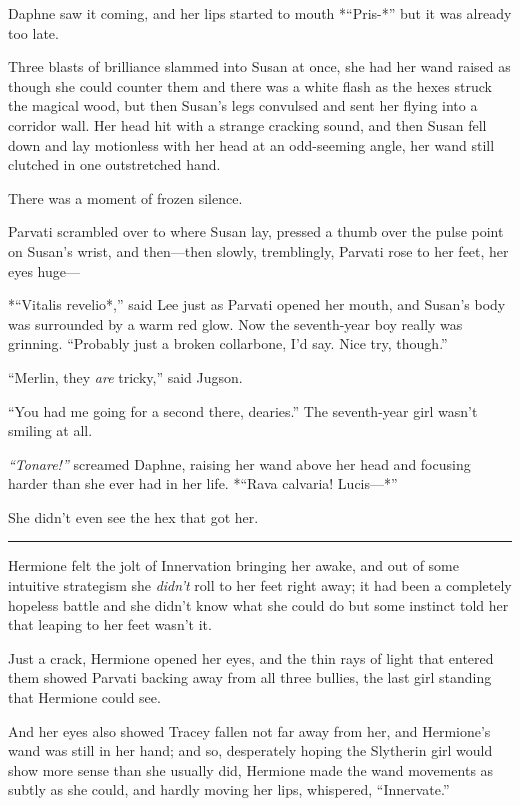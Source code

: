 Daphne saw it coming, and her lips started to mouth *``Pris-*'' but it
was already too late.

Three blasts of brilliance slammed into Susan at once, she had her wand
raised as though she could counter them and there was a white flash as
the hexes struck the magical wood, but then Susan's legs convulsed and
sent her flying into a corridor wall. Her head hit with a strange
cracking sound, and then Susan fell down and lay motionless with her
head at an odd-seeming angle, her wand still clutched in one
outstretched hand.

There was a moment of frozen silence.

Parvati scrambled over to where Susan lay, pressed a thumb over the
pulse point on Susan's wrist, and then---then slowly, tremblingly,
Parvati rose to her feet, her eyes huge---

*``Vitalis revelio*,'' said Lee just as Parvati opened her mouth, and
Susan's body was surrounded by a warm red glow. Now the seventh-year boy
really was grinning. ``Probably just a broken collarbone, I'd say. Nice
try, though.''

``Merlin, they \emph{are} tricky,'' said Jugson.

``You had me going for a second there, dearies.'' The seventh-year girl
wasn't smiling at all.

\emph{``Tonare!''} screamed Daphne, raising her wand above her head and
focusing harder than she ever had in her life. *``Rava calvaria!
Lucis---*''

She didn't even see the hex that got her.

\begin{center}\rule{3in}{0.4pt}\end{center}

Hermione felt the jolt of Innervation bringing her awake, and out of
some intuitive strategism she \emph{didn't} roll to her feet right away;
it had been a completely hopeless battle and she didn't know what she
could do but some instinct told her that leaping to her feet wasn't it.

Just a crack, Hermione opened her eyes, and the thin rays of light that
entered them showed Parvati backing away from all three bullies, the
last girl standing that Hermione could see.

And her eyes also showed Tracey fallen not far away from her, and
Hermione's wand was still in her hand; and so, desperately hoping the
Slytherin girl would show more sense than she usually did, Hermione made
the wand movements as subtly as she could, and hardly moving her lips,
whispered, ``Innervate.''


